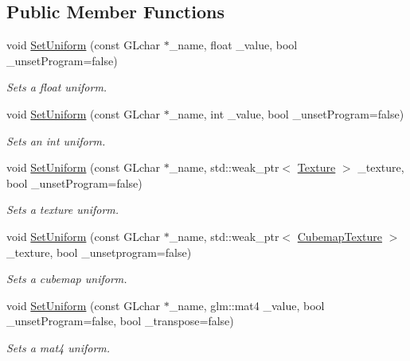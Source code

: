 \subsection*{Public Member Functions}
\begin{DoxyCompactItemize}
\item 
void \hyperlink{classfrontier_1_1_shader_ae893f9f790c70ef2abaa0f1ba58bfec1}{Set\+Uniform} (const G\+Lchar $\ast$\+\_\+name, float \+\_\+value, bool \+\_\+unset\+Program=false)
\begin{DoxyCompactList}\small\item\em Sets a float uniform. \end{DoxyCompactList}\item 
void \hyperlink{classfrontier_1_1_shader_ae11b17bf3cc75186024f9a058cf06cb7}{Set\+Uniform} (const G\+Lchar $\ast$\+\_\+name, int \+\_\+value, bool \+\_\+unset\+Program=false)
\begin{DoxyCompactList}\small\item\em Sets an int uniform. \end{DoxyCompactList}\item 
void \hyperlink{classfrontier_1_1_shader_ad9bb90b3f092c6925293cee5013c9400}{Set\+Uniform} (const G\+Lchar $\ast$\+\_\+name, std\+::weak\+\_\+ptr$<$ \hyperlink{classfrontier_1_1_texture}{Texture} $>$ \+\_\+texture, bool \+\_\+unset\+Program=false)
\begin{DoxyCompactList}\small\item\em Sets a texture uniform. \end{DoxyCompactList}\item 
void \hyperlink{classfrontier_1_1_shader_a801d8cdbe9d924c601fddcdf9744c0d3}{Set\+Uniform} (const G\+Lchar $\ast$\+\_\+name, std\+::weak\+\_\+ptr$<$ \hyperlink{classfrontier_1_1_cubemap_texture}{Cubemap\+Texture} $>$ \+\_\+texture, bool \+\_\+unsetprogram=false)
\begin{DoxyCompactList}\small\item\em Sets a cubemap uniform. \end{DoxyCompactList}\item 
void \hyperlink{classfrontier_1_1_shader_adebc3dfdc6b24535ed01cfc5a8f69867}{Set\+Uniform} (const G\+Lchar $\ast$\+\_\+name, glm\+::mat4 \+\_\+value, bool \+\_\+unset\+Program=false, bool \+\_\+transpose=false)
\begin{DoxyCompactList}\small\item\em Sets a mat4 uniform. \end{DoxyCompactList}\item 

\end{DoxyCompactItemize}
